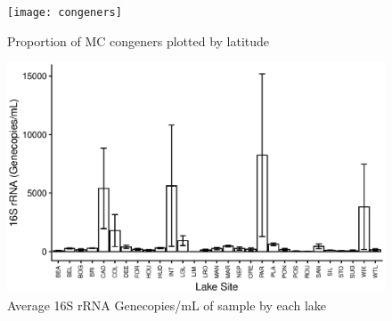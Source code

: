 \begin{figure}[!ht]
  \texttt{[image: congeners]}
    \caption{Proportion of MC congeners plotted by latitude}
  \label{congenerlat}
\end{figure}

\begin{figure}[!ht]
\includegraphics{figures/bar16srna}
\caption{Average 16S rRNA Genecopies/mL of sample by each lake}
\label{box16srna}
\end{figure}

